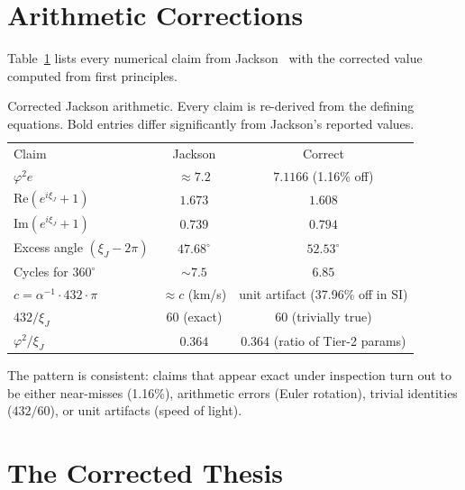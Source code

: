 \documentclass[
  aps,
  prd,
  twocolumn,
  superscriptaddress,
  nofootinbib,
  floatfix
]{revtex4-2}
\newcommand{\xiJ}{\xi_J}
\begin{document}
\section{Arithmetic Corrections}
\label{sec:corrections}

Table~\ref{tab:corrections} lists every numerical claim from
Jackson~\cite{jackson2026curved} with the corrected value computed
from first principles.

\begin{table}[h]
\caption{Corrected Jackson arithmetic.  Every claim is re-derived from
the defining equations.  Bold entries differ significantly from Jackson's
reported values.}
\label{tab:corrections}
\begin{ruledtabular}
\begin{tabular}{lcc}
\textrm{Claim} & \textrm{Jackson} & \textrm{Correct} \\
\colrule
$\varphi^2 e$                    & $\approx 7.2$   & $\mathbf{7.1166}$ (1.16\% off) \\
$\mathrm{Re}(e^{i\xiJ}+1)$      & $1.673$          & $\mathbf{1.608}$              \\
$\mathrm{Im}(e^{i\xiJ}+1)$      & $0.739$          & $\mathbf{0.794}$              \\
Excess angle $(\xiJ - 2\pi)$     & $47.68^\circ$    & $\mathbf{52.53}^\circ$        \\
Cycles for $360^\circ$           & $\sim 7.5$       & $\mathbf{6.85}$               \\
$c = \alpha^{-1}\cdot 432\cdot\pi$ & $\approx c$ (km/s) & unit artifact (37.96\% off in SI) \\
$432/\xiJ$                       & $60$ (exact)     & $60$ (trivially true)         \\
$\varphi^2/\xiJ$                 & $0.364$          & $0.364$ (ratio of Tier-2 params) \\
\end{tabular}
\end{ruledtabular}
\end{table}

The pattern is consistent: claims that appear exact under inspection turn
out to be either near-misses (1.16\%), arithmetic errors (Euler rotation),
trivial identities ($432/60$), or unit artifacts (speed of light).

\section{The Corrected Thesis}
\label{sec:thesis}
\end{document}
